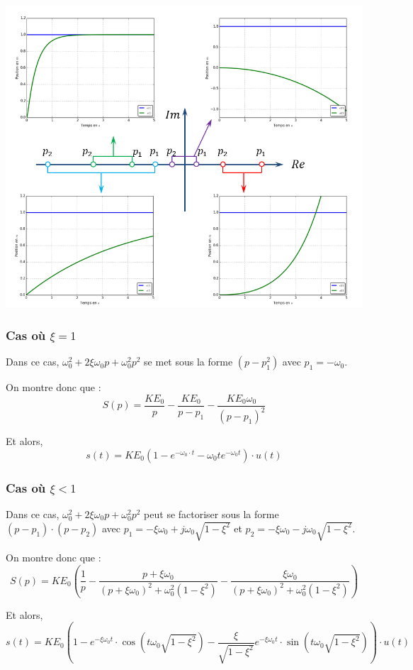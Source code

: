\documentclass[10pt,oneside]{article}
\begin{document}
\begin{center}
 \includegraphics[width=.8\textwidth]{png/poles_1}
\end{center}

\subsubsection{Cas où $\xi=1$}
Dans ce cas, $\omega_0^2+2\xi\omega_0 p+\omega_0^2 p^2$ se met sous la forme $\left( p-p_1^2\right) $ avec $p_1 = -\omega_0$.

On montre donc que :
$$
S(p)= \dfrac{KE_0}{p} - \dfrac{KE_0}{p-p_1} - \dfrac{KE_0 \omega_0}{\left(p-p_1\right)^2}
$$

Et alors, 
$$
s(t) = KE_0\left(1- e^{-\omega_0 \cdot t} -\omega_0 t  e^{-\omega_0t} \right) \cdot u(t)
$$

\subsubsection{Cas où $\xi<1$}
Dans ce cas, $\omega_0^2+2\xi\omega_0 p+\omega_0^2 p^2$ peut se factoriser sous la forme $\left(p-p_1\right)\cdot\left(p-p_2\right)$ avec $p_1 = -\xi\omega_0 + j \omega_0 \sqrt{1-\xi^2}$ et $p_2 = -\xi\omega_0 - j \omega_0 \sqrt{1-\xi^2}$.

On montre donc que :
$$
S(p)= KE_0\left( 
\dfrac{1}{p}
-\dfrac{p+\xi\omega_0}{\left( p+\xi\omega_0\right)^2+\omega_0^2\left(1-\xi^2\right)}
-\dfrac{\xi\omega_0}{\left( p+\xi\omega_0\right)^2+\omega_0^2\left(1-\xi^2\right)}
\right)
$$

Et alors, 
$$
s(t) = KE_0\left(1
- e^{-\xi\omega_0 t}\cdot\cos \left(t\omega_0 \sqrt{1-\xi^2} \right)
- \dfrac{\xi}{\sqrt{1-\xi^2}} e^{-\xi\omega_0 t}\cdot\sin \left(t\omega_0 \sqrt{1-\xi^2} \right)
\right) \cdot u(t)
$$
\end{document}
